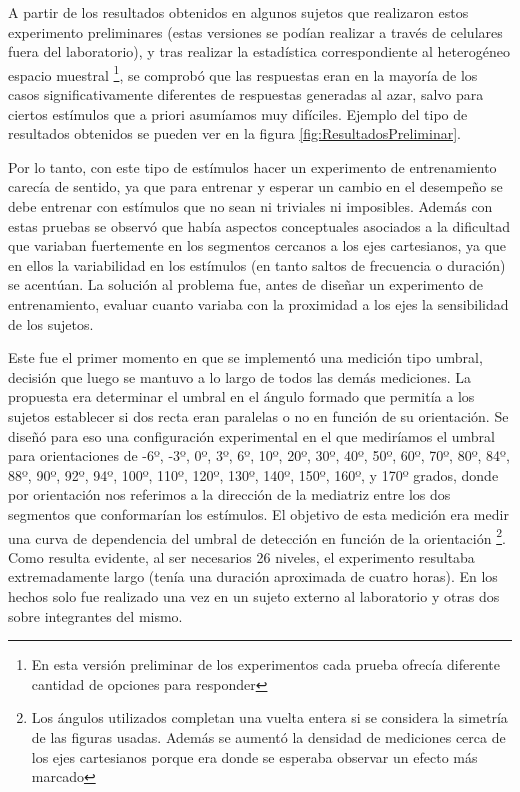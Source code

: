 \documentclass{article}
\numberwithin{figure}{section}
\begin{document}
    A partir de los resultados obtenidos en algunos sujetos que realizaron estos experimento preliminares (estas versiones se podían realizar a través de celulares fuera del laboratorio), y tras realizar la estadística correspondiente al heterogéneo espacio muestral \footnote{En esta versión preliminar de los experimentos cada prueba ofrecía diferente cantidad de opciones para responder}, se comprobó que las respuestas eran en la mayoría de los casos significativamente diferentes de respuestas generadas al azar, salvo para ciertos estímulos que a priori asumíamos muy difíciles. Ejemplo del tipo de resultados obtenidos se pueden ver en la figura \ref{fig:ResultadosPreliminar}. 
    
    Por lo tanto, con este tipo de estímulos hacer un experimento de entrenamiento carecía de sentido, ya que para entrenar y esperar un cambio en el desempeño se debe entrenar con estímulos que no sean ni triviales ni imposibles. Además con estas pruebas se observó que había aspectos conceptuales asociados a la dificultad que variaban fuertemente en los segmentos cercanos a los ejes cartesianos, ya que en ellos la variabilidad en los estímulos (en tanto saltos de frecuencia o duración) se acentúan. La solución al problema fue, antes de diseñar un experimento de entrenamiento, evaluar cuanto variaba con la proximidad a los ejes la sensibilidad de los sujetos. 
    
    Este fue el primer momento en que se implementó una medición tipo umbral, decisión que luego se mantuvo a lo largo de todos las demás mediciones. La propuesta era determinar el umbral en el ángulo formado que permitía a los sujetos establecer si dos recta eran paralelas o no en función de su orientación. Se diseñó para eso una configuración experimental en el que mediríamos el umbral para orientaciones de -6º, -3º, 0º, 3º, 6º, 10º, 20º, 30º, 40º, 50º, 60º, 70º, 80º, 84º, 88º, 90º, 92º, 94º, 100º, 110º, 120º, 130º, 140º, 150º, 160º, y 170º grados, donde por orientación nos referimos a la dirección de la mediatriz entre los dos segmentos que conformarían los estímulos. El objetivo de esta medición era medir una curva de dependencia del umbral de detección en función de la orientación \footnote{Los ángulos utilizados completan una vuelta entera si se considera la simetría de las figuras usadas. Además se aumentó la densidad de mediciones cerca de los ejes cartesianos porque era donde se esperaba observar un efecto más marcado}. Como resulta evidente, al ser necesarios 26 niveles, el experimento resultaba extremadamente largo (tenía una duración aproximada de cuatro horas). En los hechos solo fue realizado una vez en un sujeto externo al laboratorio y otras dos sobre integrantes del mismo.
    
\end{document}
